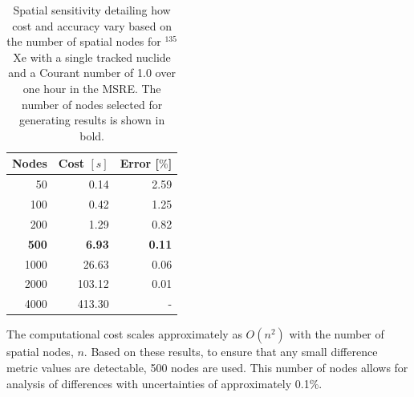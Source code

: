 \documentclass{style/nseJournal}
\begin{document}
\begin{table}[!ht]
    \centering
    \caption{Spatial sensitivity detailing how cost and accuracy vary based on the number of spatial nodes for $^{135}$Xe with a single tracked nuclide and a Courant number of 1.0 over one hour in the MSRE. The number of nodes selected for generating results is shown in bold.}
    \begin{tabular}{r r r}
       \hline
       Nodes  & Cost $[s]$ & Error [$\%$]\\
       \hline
    50 & 0.14 & 2.59 \\
    100 & 0.42 & 1.25 \\
    200 & 1.29 & 0.82 \\
    \textbf{500} & \textbf{6.93} & \textbf{0.11} \\
    1000 & 26.63 & 0.06 \\
    2000 & 103.12 & 0.01 \\
    4000 & 413.30 & - \\
        \hline
    \end{tabular}
    \label{tab:spat-ref}
\end{table}


The computational cost scales approximately as $O(n^2)$ with the number of spatial nodes, $n$.
Based on these results, to ensure that any small difference metric values are detectable, 500 nodes are used.
This number of nodes allows for analysis of differences with uncertainties of approximately 0.1\%.
\end{document}
